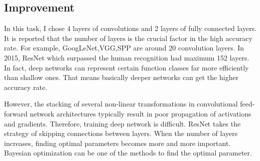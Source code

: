 \subsection{Improvement}


In this task, I chose 4 layers of convolutions and 2 layers of fully connected layers. It is reported that the number of layers is the crucial factor in the high accuracy rate. For example, GoogLeNet,VGG,SPP are around 20 convolution layers. In 2015, ResNet which surpassed the human recognition had maximum 152 layers. In fact, deep networks can represent certain function classes far more efficiently than shallow ones. That means basically deeper networks can get the higher accuracy rate.

However, the stacking of several non-linear transformations in convolutional feed-forward network architectures typically result in poor propagation of activations and gradients. Therefore, training deep network is difficult. ResNet takes the strategy of skipping connections between layers. When the number of layers increases, finding optimal parameters becomes more and more important. Bayesian optimization can be one of the methods to find the optimal parameter.  